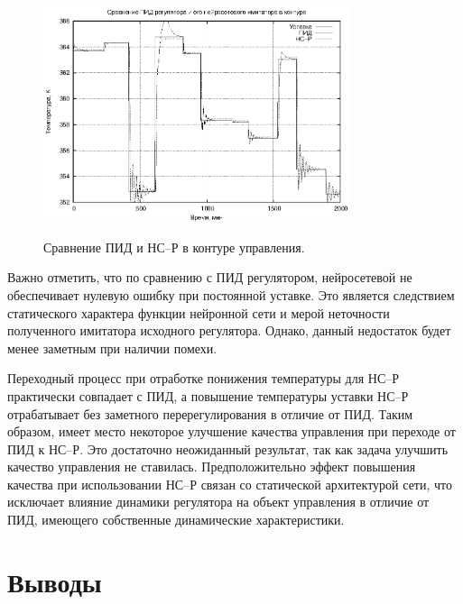 \begin{figure}[h]
  \centering
  \includegraphics[width=0.8\textwidth,%
    totalheight=0.35\textheight]{cstr_pid_vs_nnc_inloop_rus} \\
  \caption{Сравнение ПИД и НС--Р в контуре управления.}%
  \label{fig:cstr_pid_vs_nnc_inloop_rus}
\end{figure}

Важно отметить, что по сравнению с ПИД регулятором, нейросетевой не
обеспечивает нулевую ошибку при постоянной уставке.  Это является
следствием статического характера функции нейронной сети и мерой
неточности полученного имитатора исходного регулятора.  Однако, данный
недостаток будет менее заметным при наличии помехи.

Переходный процесс при отработке понижения температуры для НС--Р
практически совпадает с ПИД, а повышение температуры уставки НС--Р
отрабатывает без заметного перерегулирования в отличие от ПИД.  Таким
образом, имеет место некоторое улучшение качества управления при
переходе от ПИД к НС--Р.  Это достаточно неожиданный результат, так
как задача улучшить качество управления не ставилась.
Предположительно эффект повышения качества при использовании НС--Р
связан со статической архитектурой сети, что исключает влияние
динамики регулятора на объект управления в отличие от ПИД, имеющего
собственные динамические характеристики.


\section{Выводы}

